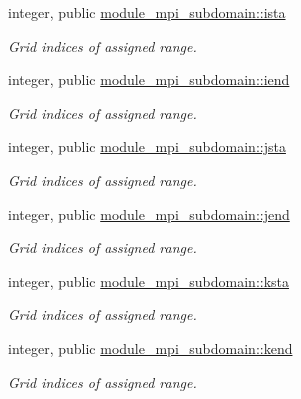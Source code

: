 \textbf{ }\par
\begin{DoxyCompactItemize}
\item 
integer, public \mbox{\hyperlink{namespacemodule__mpi__subdomain_a84290c344044aaadb0957d8530f360b6}{module\+\_\+mpi\+\_\+subdomain\+::ista}}
\begin{DoxyCompactList}\small\item\em Grid indices of assigned range. \end{DoxyCompactList}\item 
integer, public \mbox{\hyperlink{namespacemodule__mpi__subdomain_ac0d40d9eee1ec5249fb230e7d73959d5}{module\+\_\+mpi\+\_\+subdomain\+::iend}}
\begin{DoxyCompactList}\small\item\em Grid indices of assigned range. \end{DoxyCompactList}\item 
integer, public \mbox{\hyperlink{namespacemodule__mpi__subdomain_a87c16acea97b6100c4629bda8a090169}{module\+\_\+mpi\+\_\+subdomain\+::jsta}}
\begin{DoxyCompactList}\small\item\em Grid indices of assigned range. \end{DoxyCompactList}\item 
integer, public \mbox{\hyperlink{namespacemodule__mpi__subdomain_a5c6fcfcea80e9294d32411c15091955c}{module\+\_\+mpi\+\_\+subdomain\+::jend}}
\begin{DoxyCompactList}\small\item\em Grid indices of assigned range. \end{DoxyCompactList}\item 
integer, public \mbox{\hyperlink{namespacemodule__mpi__subdomain_a3eab4b23cbc7b4ab032da06300bfca6f}{module\+\_\+mpi\+\_\+subdomain\+::ksta}}
\begin{DoxyCompactList}\small\item\em Grid indices of assigned range. \end{DoxyCompactList}\item 
integer, public \mbox{\hyperlink{namespacemodule__mpi__subdomain_a2d63d8a25db336795c14328ed3b31047}{module\+\_\+mpi\+\_\+subdomain\+::kend}}
\begin{DoxyCompactList}\small\item\em Grid indices of assigned range. \end{DoxyCompactList}\end{DoxyCompactItemize}

